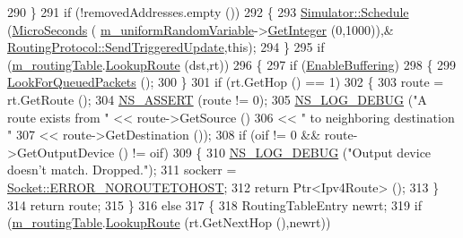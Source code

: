 \begin{DoxyCode}
290     \}
291   \textcolor{keywordflow}{if} (!removedAddresses.empty ())
292     \{
293       \hyperlink{classns3_1_1Simulator_a671882c894a08af4a5e91181bf1eec13}{Simulator::Schedule} (\hyperlink{group__timecivil_ga17465a639c8d1464e76538afdd78a9f0}{MicroSeconds} (
      \hyperlink{classns3_1_1dsdv_1_1RoutingProtocol_a2d5efde0680b47457d0b94d0493c9eec}{m\_uniformRandomVariable}->\hyperlink{classns3_1_1RandomVariableStream_a66cd94e6305ce7f000f1a9ff0fcb9aef}{GetInteger} (0,1000)),&
      \hyperlink{classns3_1_1dsdv_1_1RoutingProtocol_adc414310ddaa5e69520a176c0dac59cc}{RoutingProtocol::SendTriggeredUpdate},\textcolor{keyword}{this});
294     \}
295   \textcolor{keywordflow}{if} (\hyperlink{classns3_1_1dsdv_1_1RoutingProtocol_acc4cee466c2591e35f508ce58097a00e}{m\_routingTable}.\hyperlink{classns3_1_1dsdv_1_1RoutingTable_a0bfb9dc677f02bd740973865e38df763}{LookupRoute} (dst,rt))
296     \{
297       \textcolor{keywordflow}{if} (\hyperlink{classns3_1_1dsdv_1_1RoutingProtocol_a257bf2eb6e7eff700d12f00f2d9ec0e3}{EnableBuffering})
298         \{
299           \hyperlink{classns3_1_1dsdv_1_1RoutingProtocol_a775bb168f6e8c4feb854aba73326681e}{LookForQueuedPackets} ();
300         \}
301       \textcolor{keywordflow}{if} (rt.GetHop () == 1)
302         \{
303           route = rt.GetRoute ();
304           \hyperlink{assert_8h_a6dccdb0de9b252f60088ce281c49d052}{NS\_ASSERT} (route != 0);
305           \hyperlink{group__logging_ga413f1886406d49f59a6a0a89b77b4d0a}{NS\_LOG\_DEBUG} (\textcolor{stringliteral}{"A route exists from "} << route->GetSource ()
306                                                << \textcolor{stringliteral}{" to neighboring destination "}
307                                                << route->GetDestination ());
308           \textcolor{keywordflow}{if} (oif != 0 && route->GetOutputDevice () != oif)
309             \{
310               \hyperlink{group__logging_ga413f1886406d49f59a6a0a89b77b4d0a}{NS\_LOG\_DEBUG} (\textcolor{stringliteral}{"Output device doesn't match. Dropped."});
311               sockerr = \hyperlink{classns3_1_1Socket_ada1328c5ae0c28cb2a982caf8f6d6ccaa0f8ecb5a4ddbce3bade35fa12c3d49e8}{Socket::ERROR\_NOROUTETOHOST};
312               \textcolor{keywordflow}{return} Ptr<Ipv4Route> ();
313             \}
314           \textcolor{keywordflow}{return} route;
315         \}
316       \textcolor{keywordflow}{else}
317         \{
318           RoutingTableEntry newrt;
319           \textcolor{keywordflow}{if} (\hyperlink{classns3_1_1dsdv_1_1RoutingProtocol_acc4cee466c2591e35f508ce58097a00e}{m\_routingTable}.\hyperlink{classns3_1_1dsdv_1_1RoutingTable_a0bfb9dc677f02bd740973865e38df763}{LookupRoute} (rt.GetNextHop (),newrt))

\end{DoxyCode}
